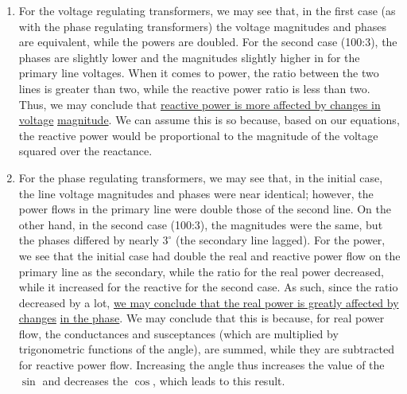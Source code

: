 \documentclass[
	letterpaper, %
	10pt, %
]{CSUniSchoolLabReport}
\begin{document}
\begin{enumerate}

  \item For the voltage regulating transformers, we may see that, in the first case (as with the phase regulating transformers) the voltage magnitudes and phases are equivalent, while the powers are doubled. For the second case (100:3), the phases are slightly lower and the magnitudes slightly higher in for the primary line voltages. When it comes to power, the ratio between the two lines is greater than two, while the reactive power ratio is less than two. Thus, we may conclude that \underline{reactive power is more affected by changes in voltage} \underline{magnitude}. We can assume this is so because, based on our equations, the reactive power would be proportional to the magnitude of the voltage squared over the reactance.

  \item For the phase regulating transformers, we may see that, in the initial case, the line voltage magnitudes and phases were near identical; however, the power flows in the primary line were double those of the second line. On the other hand, in the second case (100:3), the magnitudes were the same, but the phases differed by nearly $3^{\circ}$ (the secondary line lagged). For the power, we see that the initial case had double the real and reactive power flow on the primary line as the secondary, while the ratio for the real power decreased, while it increased for the reactive for the second case. As such, since the ratio decreased by a lot, \underline{we may conclude that the real power is greatly affected by changes} \underline{in the phase}. We may conclude that this is because, for real power flow, the conductances and susceptances (which are multiplied by trigonometric functions of the angle), are summed, while they are subtracted for reactive power flow. Increasing the angle thus increases the value of the $\sin$ and decreases the $\cos$, which leads to this result.

\end{enumerate}
\end{document}
